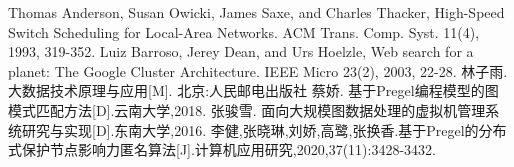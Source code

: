 \documentclass[10pt,a4paper,twocolumn,twoside,UTF8]{ctexart}
\begin{document}
	\begin{thebibliography}{99}  
		Thomas Anderson, Susan Owicki, James Saxe, and Charles Thacker, High-Speed Switch Scheduling for Local-Area Networks. ACM Trans. Comp. Syst. 11(4), 1993, 319-352.		
		Luiz Barroso, Jerey Dean, and Urs Hoelzle, Web search for a planet: The Google Cluster Architecture. IEEE Micro 23(2), 2003, 22-28.  
		林子雨. 大数据技术原理与应用[M]. 北京:人民邮电出版社  
		蔡娇. 基于Pregel编程模型的图模式匹配方法[D].云南大学,2018.
		张骏雪. 面向大规模图数据处理的虚拟机管理系统研究与实现[D].东南大学,2016.
		李健,张晓琳,刘娇,高鹭,张换香.基于Pregel的分布式保护节点影响力匿名算法[J].计算机应用研究,2020,37(11):3428-3432.
	\end{thebibliography}
\end{document}
